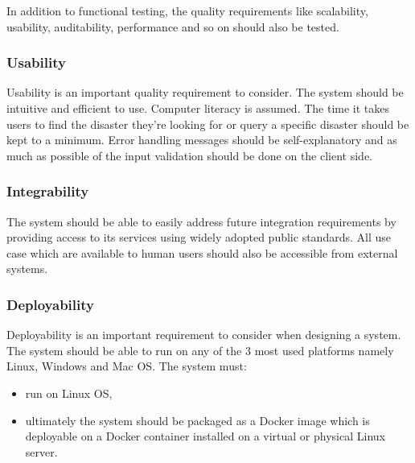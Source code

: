 In addition to functional testing, the quality requirements like scalability, usability, auditability, performance and so on should also be tested.

\subsubsection{Usability}
Usability is an important quality requirement to consider. The system should be intuitive and efficient to use. Computer literacy is assumed. The time it takes users to find the disaster they're looking for or query a specific disaster should be kept to a minimum. Error handling messages should be self-explanatory and as much as possible of the input validation should be done on the client side.

\subsubsection{Integrability}
The system should be able to easily address future integration requirements by providing access to its services using widely adopted public standards. All use case which are available to human users should also be accessible from external systems.

\subsubsection{Deployability}
Deployability is an important requirement to consider when designing a system. The system should be able to run on any of the 3 most used platforms namely Linux, Windows and Mac OS. The system must:
\begin{itemize}
	\item run on Linux OS,
	\item ultimately the system should be packaged as a Docker image which is deployable on a Docker
container installed on a virtual or physical Linux server.
\end{itemize}

